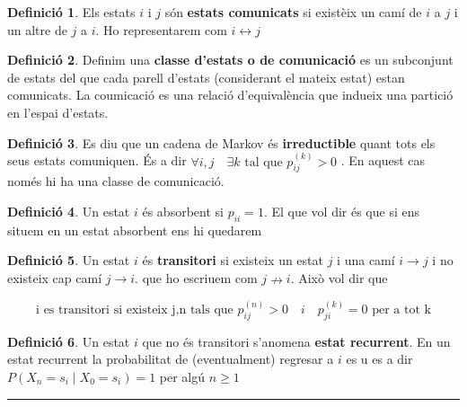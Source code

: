 \documentclass[
  catalan,
]{article}
\theoremstyle{definition}
\newtheorem{definition}{Definició}[section]
\theoremstyle{definition}
\theoremstyle{definition}
\theoremstyle{definition}
\theoremstyle{remark}
\begin{document}
\begin{definition}
Els estats \(i\) i \(j\) són \textbf{estats comunicats} si existèix un camí de \(i\) a \(j\) i un altre de \(j\) a \(i\). Ho representarem com \(i \leftrightarrow j\)
\end{definition}

\begin{definition}
Definim una \textbf{classe d'estats o de comunicació} es un subconjunt de estats del que cada parell d'estats (considerant el mateix estat) estan comunicats. La coumicació es una relació d'equivalència que indueix una partició en l'espai d'estats.
\end{definition}

\begin{definition}
Es diu que un cadena de Markov és \textbf{irreductible} quant tots els seus estats comuniquen. És a dir \(\forall i, j  \quad \exists k  \text{ tal que } p_{ij}^{(k)}>0\) . En aquest cas només hi ha una classe de comunicació.
\end{definition}

\begin{definition}
Un estat \(i\) és absorbent si \(p_{ii}=1\). El que vol dir és que si ens situem en un estat absorbent ens hi quedarem
\end{definition}

\begin{definition}
Un estat \(i\) és \textbf{transitori} si existeix un estat \(j\) i una camí \(i \rightarrow j\) i no existeix cap camí
\(j \rightarrow i\). que ho escriuem com \(j \nrightarrow i\). Això vol dir que

\[
\text{i es transitori si existeix j,n tals que } p_{ij}^{(n)}>0 \quad i \quad p_{ji}^{(k)}=0 \text{ per a tot k}
\]
\end{definition}

\begin{definition}
Un estat \(i\) que no és transitori s'anomena \textbf{estat recurrent}. En un estat recurrent la probabilitat de (eventualment) regresar a \(i\) es u es a dir \(P(X_n=s_i \mid X_0=s_i)=1\) per algú \(n\geq 1\)
\end{definition}

\begin{center}\rule{0.5\linewidth}{0.5pt}\end{center}
\end{document}
